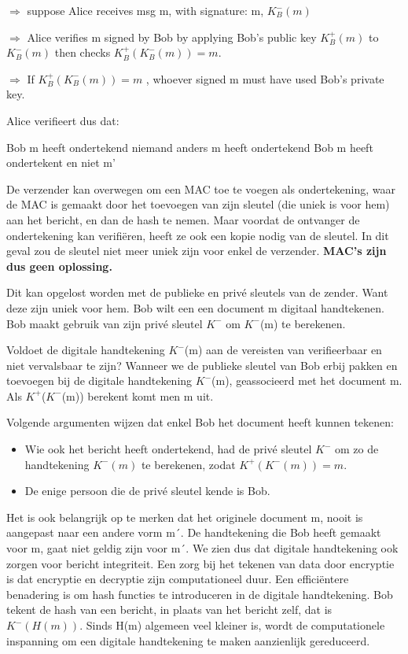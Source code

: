 \noindent $\Rightarrow$ suppose Alice receives msg m, with signature: m,  $K^-_B (m)$

\noindent $\Rightarrow$ Alice verifies m signed by Bob by applying Bob’s public key  $K^+_B (m)$ to  $K^-_B (m)$ then checks  $K^+_B (K^-_B (m)) = m $.

\noindent $\Rightarrow$ If $K^+_B (K^-_B (m)) = m $ , whoever signed m must have used Bob’s private key.

\noindent Alice verifieert dus dat:

\bi
\itf Bob m heeft ondertekend
\itf niemand anders m heeft ondertekend
\itf Bob m heeft ondertekent en niet m'
\ei

\noindent De verzender kan overwegen om een MAC toe te voegen als ondertekening, waar de MAC is gemaakt door het toevoegen van zijn sleutel (die uniek is voor hem) aan het bericht, en dan de hash te nemen. Maar voordat de ontvanger de ondertekening kan verifiëren, heeft ze ook een kopie nodig van de sleutel. In dit geval zou de sleutel niet meer uniek zijn voor enkel de verzender. \textbf{MAC’s zijn dus geen oplossing.}

\noindent Dit kan opgelost worden met de publieke en privé sleutels van de zender. Want deze zijn uniek voor hem. Bob wilt een een document m digitaal handtekenen. Bob maakt gebruik van zijn privé sleutel $K^-$ om $K^-$(m) te berekenen.

\newpage

\noindent Voldoet de digitale handtekening $K^-$(m) aan de vereisten van verifieerbaar en niet vervalsbaar te zijn? Wanneer we de publieke sleutel van Bob erbij pakken en toevoegen bij de digitale handtekening $K^-$(m), geassocieerd met het document m. Als $K^+$($K^-$(m)) berekent komt men m uit. 

\noindent Volgende argumenten wijzen dat enkel Bob het document heeft kunnen tekenen:
\begin{itemize}
\item Wie ook het bericht heeft ondertekend, had de privé sleutel $K^-$ om zo de handtekening $K^- (m)$ te berekenen, zodat $K^+(K^- (m)) = m$.
\item De enige persoon die de privé sleutel kende is Bob.
\end{itemize}
\noindent Het is ook belangrijk op te merken dat het originele document m, nooit is aangepast naar een andere vorm m´. De handtekening die Bob heeft gemaakt voor m, gaat niet geldig zijn voor m´. We zien dus dat digitale handtekening ook zorgen voor bericht integriteit.
Een zorg bij het tekenen van data door encryptie is dat encryptie en decryptie zijn computationeel duur. Een efficiëntere benadering is om hash functies te introduceren in de digitale handtekening. Bob tekent de hash van een bericht, in plaats van het bericht zelf, dat is $K^{-}(H(m))$. Sinds H(m) algemeen veel kleiner is, wordt de computationele inspanning om een digitale handtekening te maken aanzienlijk gereduceerd.

